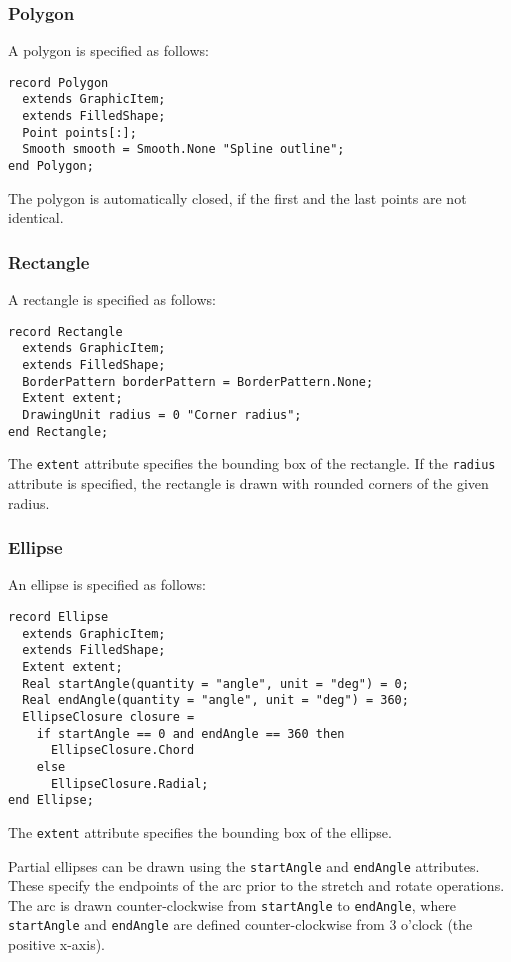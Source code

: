 \subsubsection{Polygon}\label{polygon}

A polygon is specified as follows:
\begin{lstlisting}[language=modelica]
record Polygon
  extends GraphicItem;
  extends FilledShape;
  Point points[:];
  Smooth smooth = Smooth.None "Spline outline";
end Polygon;
\end{lstlisting}%
The polygon is automatically closed, if the first and the last points are not identical.

\subsubsection{Rectangle}\label{rectangle}

A rectangle is specified as follows:
\begin{lstlisting}[language=modelica]
record Rectangle
  extends GraphicItem;
  extends FilledShape;
  BorderPattern borderPattern = BorderPattern.None;
  Extent extent;
  DrawingUnit radius = 0 "Corner radius";
end Rectangle;
\end{lstlisting}%
The \lstinline!extent! attribute specifies the bounding box of the rectangle.
If the \lstinline!radius! attribute is specified, the rectangle is drawn with rounded corners of the given radius.

\subsubsection{Ellipse}\label{ellipse}

An ellipse is specified as follows:
\begin{lstlisting}[language=modelica]
record Ellipse
  extends GraphicItem;
  extends FilledShape;
  Extent extent;
  Real startAngle(quantity = "angle", unit = "deg") = 0;
  Real endAngle(quantity = "angle", unit = "deg") = 360;
  EllipseClosure closure =
    if startAngle == 0 and endAngle == 360 then
      EllipseClosure.Chord
    else
      EllipseClosure.Radial;
end Ellipse;
\end{lstlisting}%
The \lstinline!extent! attribute specifies the bounding box of the ellipse.

Partial ellipses can be drawn using the \lstinline!startAngle! and \lstinline!endAngle! attributes.  These specify the endpoints of the arc prior to the stretch and rotate operations.  The arc is drawn counter-clockwise from \lstinline!startAngle! to \lstinline!endAngle!, where \lstinline!startAngle! and \lstinline!endAngle! are defined counter-clockwise from 3 o'clock (the positive x-axis).

